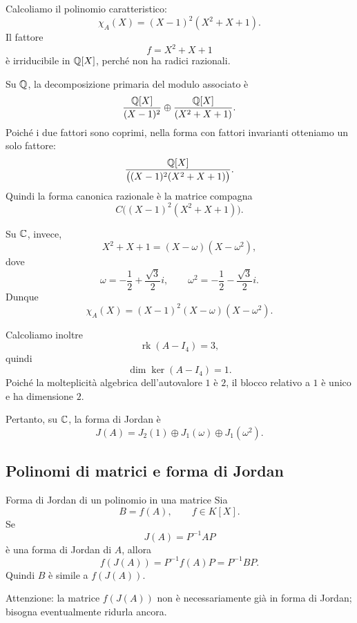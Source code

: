 \documentclass[a4paper]{article}
\begin{document}
\begin{radioactive}
\begin{snippetsolution}{}
    Calcoliamo il polinomio caratteristico:
    \[
        \chi_A(X)
        =
        (X-1)^2(X^2+X+1).
    \]
    Il fattore
    \[
        f=X^2+X+1
    \]
    è irriducibile in \(\mathbb{Q}[X]\), perché non ha radici razionali.

    Su \(\mathbb{Q}\), la decomposizione primaria del modulo associato è
    \[
        \frac{\mathbb{Q}[X]}{(X-1)^2}
        \oplus
        \frac{\mathbb{Q}[X]}{(X^2+X+1)}.
    \]
    Poiché i due fattori sono coprimi, nella forma con fattori invarianti otteniamo un solo fattore:
    \[
        \frac{\mathbb{Q}[X]}{\big((X-1)^2(X^2+X+1)\big)}.
    \]
    Quindi la forma canonica razionale è la matrice compagna
    \[
        C\big((X-1)^2(X^2+X+1)\big).
    \]

    Su \(\mathbb{C}\), invece,
    \[
        X^2+X+1=(X-\omega)(X-\omega^2),
    \]
    dove
    \[
        \omega=-\frac{1}{2}+\frac{\sqrt{3}}{2}i,
        \qquad
        \omega^2=-\frac{1}{2}-\frac{\sqrt{3}}{2}i.
    \]
    Dunque
    \[
        \chi_A(X)=(X-1)^2(X-\omega)(X-\omega^2).
    \]

    Calcoliamo inoltre
    \[
        \operatorname{rk}(A-I_4)=3,
    \]
    quindi
    \[
        \dim\ker(A-I_4)=1.
    \]
    Poiché la molteplicità algebrica dell'autovalore \(1\) è \(2\), il blocco relativo a \(1\) è unico e ha dimensione \(2\).

    Pertanto, su \(\mathbb{C}\), la forma di Jordan è
    \[
        J(A)=J_2(1)\oplus J_1(\omega)\oplus J_1(\omega^2).
    \]
\end{snippetsolution}
\end{radioactive}

\subsection{Polinomi di matrici e forma di Jordan}

\begin{radioactive}
\begin{snippetproposition}{Forma di Jordan di un polinomio in una matrice}
    Sia
    \[
        B=f(A),
        \qquad
        f\in K[X].
    \]
    Se
    \[
        J(A)=P^{-1}AP
    \]
    è una forma di Jordan di \(A\), allora
    \[
        f(J(A))=P^{-1}f(A)P=P^{-1}BP.
    \]
    Quindi \(B\) è simile a \(f(J(A))\).

    Attenzione: la matrice \(f(J(A))\) non è necessariamente già in forma di Jordan; bisogna eventualmente ridurla ancora.
\end{snippetproposition}
\end{radioactive}
\end{document}
